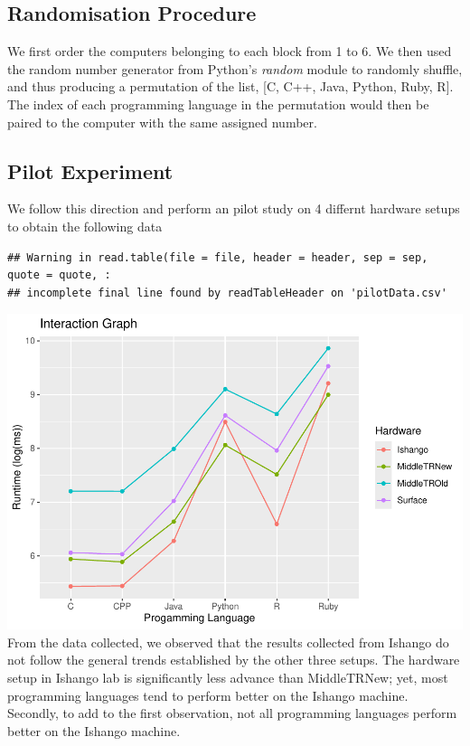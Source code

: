 \documentclass[12pt,halfline,a4paper,]{ouparticle}
\begin{document}
\subsection{Randomisation Procedure}\label{randomisation-procedure}

We first order the computers belonging to each block from 1 to 6. We
then used the random number generator from Python's \emph{random} module
to randomly shuffle, and thus producing a permutation of the list, {[}C,
C++, Java, Python, Ruby, R{]}. The index of each programming language in
the permutation would then be paired to the computer with the same
assigned number.

\subsection{Pilot Experiment}\label{pilot-experiment}

We follow this direction and perform an pilot study on 4 differnt
hardware setups to obtain the following data

\begin{verbatim}
## Warning in read.table(file = file, header = header, sep = sep, quote = quote, :
## incomplete final line found by readTableHeader on 'pilotData.csv'
\end{verbatim}

\includegraphics[width=1\linewidth]{skeleton_files/figure-latex/figPilot-1}
From the data collected, we observed that the results collected from
Ishango do not follow the general trends established by the other three
setups. The hardware setup in Ishango lab is significantly less advance
than MiddleTRNew; yet, most programming languages tend to perform better
on the Ishango machine. Secondly, to add to the first observation, not
all programming languages perform better on the Ishango machine.
\end{document}
